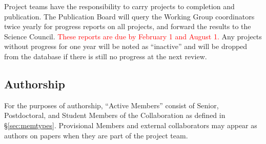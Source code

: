 \documentclass[12pt]{article}
\newcommand{\Comment}[1]{\textcolor{Blue}{(Comment: #1)}}
\newcommand{\revision}[1]{\textcolor{Red}{#1}}
\begin{document}
Project teams have the responsibility to carry projects to completion and publication.  The Publication Board will query the Working Group coordinators twice yearly for progress reports on all projects, and forward the results to the Science Council. \revision{These reports are due by February 1 and August 1.} Any projects without progress for one year will be noted as ``inactive'' and will be dropped from the database if there is still no progress at the next review.

\subsection{Authorship}

For the purposes of authorship, ``Active Members'' consist of Senior, Postdoctoral, and Student Members of the Collaboration as defined in \S\ref{sec:memtypes}.  Provisional Members and external collaborators may appear as authors on papers when they are part of the project team.
\end{document}

